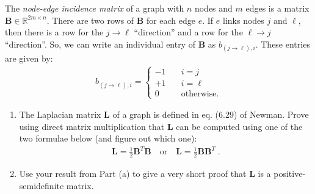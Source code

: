 \documentclass[11pt]{article}
\begin{document}
\newpage
\begin{tcolorbox}[title = 3. Node-incidence matrix and the Laplacian]
The \emph{node-edge incidence matrix} of a graph with $n$ nodes and $m$ edges is a matrix $\mathbf{B} \in \mathbb{R}^{2m\times n}$. 
There are two rows of $\mathbf{B}$ for each edge $e$. 
If $e$ links nodes $j$ and $\ell$, then there is a row for the $j\rightarrow \ell$ ``direction'' and a row for the $\ell \rightarrow j$ ``direction''. 
So, we can write an individual entry of $\mathbf{B}$ as $b_{(j\rightarrow \ell), i}$. 
These entries are given by: 
\begin{align*}
    b_{(j \rightarrow \ell), i} = \begin{cases}
        -1 &\quad i = j \\ 
        +1 &\quad i = \ell \\ 
        0 &\quad \text{otherwise.}
    \end{cases}
\end{align*}

\begin{enumerate}
    \item
    The Laplacian matrix $\mathbf{L}$ of a graph is defined in eq. (6.29) of Newman. 
    Prove using direct matrix multiplication that $\mathbf{L}$ can be computed using one of the two formulae below (and figure out which one): 
    \begin{align*}
        \mathbf{L} = \frac{1}{2}\mathbf{B}^T\mathbf{B} \quad \text{or} \quad \mathbf{L} = \frac{1}{2}\mathbf{B}\mathbf{B}^T\;. 
    \end{align*}

    \item
    Use your result from Part (a) to give a very short proof that $\mathbf{L}$ is a positive-semidefinite matrix. 
\end{enumerate}
\end{tcolorbox}

\end{document}
